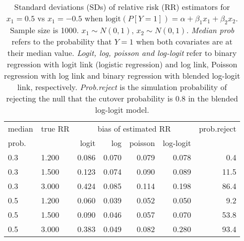 \documentclass[12pt,a4paper]{article}
\begin{document}
\begin{table}[H] 
\small\sf\centering 
\caption{Standard deviations (SDs) of relative risk (RR) estimators for $x_1=0.5$ vs $x_1=-0.5$ when $\mbox{logit}(P[Y=1])=\alpha+\beta_1 x_1 + \beta_2 x_2$. Sample size is 1000. $x_1 \sim $$N(0,1)$, $x_2 \sim N(0,1)$. {\it Median prob} refers to the probability that $Y=1$ when both covariates are at their median value. {\it Logit, log, poisson and log-logit} refer to binary regression with logit link (logistic regression) and log link, Poisson regression with log link and binary regression with blended log-logit link, respectively. {\it Prob.reject} is the simulation probability of rejecting the null that the cutover probability is $0.8$ in the blended log-logit model.} 
\begin{tabular}{llrrrrr} 
\toprule 
median & true RR & \multicolumn{4}{c}{bias of estimated RR} & prob.reject \\ 
prob. & & logit & log & poisson & log-logit  & \\ \midrule 
0.3 & 1.200 & 0.086 & 0.070 & 0.079 & 0.078 &  0.4 \\  
0.3 & 1.500 & 0.123 & 0.074 & 0.090 & 0.089 & 11.5 \\  
0.3 & 3.000 & 0.424 & 0.085 & 0.114 & 0.198 & 86.4 \\  
0.5 & 1.200 & 0.060 & 0.039 & 0.052 & 0.050 &  9.2 \\  
0.5 & 1.500 & 0.090 & 0.046 & 0.057 & 0.070 & 53.8 \\  
0.5 & 3.000 & 0.383 & 0.049 & 0.082 & 0.280 & 93.4 \\  
\bottomrule 
\end{tabular} 
\end{table} 
\end{document}
